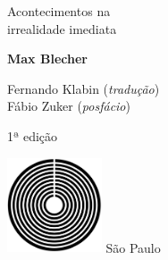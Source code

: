 




\begingroup\thispagestyle{empty}\vspace*{.05\textheight} 

              \formular
              \LARGE
              \noindent
              Acontecimentos na\\irrealidade imediata
                      
              \bigskip  
              
              \Large
              \noindent
              \textbf{Max Blecher}
              \vspace{2.5em}

              \newfontfamily{}
              {\fontsize{30}{40}\selectfont \minion\small\noindent Fernando Klabin (\textit{tradução})\\
              Fábio Zuker (\textit{posfácio})}
              \vspace{4em}

              \noindent
              {\fontsize{30}{40}\selectfont \minion\small\noindent 1ª edição}
                      
              \vfill
              \noindent
              \includegraphics[width=0.21\textwidth]{logo}
              \break{} 
              \smallskip
              {\fontsize{30}{40}\selectfont \minion\footnotesize\noindent São Paulo\quad\the\year}

\endgroup
\pagebreak
